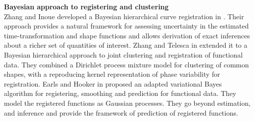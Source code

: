 \noindent
{\bf{Bayesian approach to registering and clustering}} \\
Zhang and Inoue developed a Bayesian hierarchical curve registration in \cite{Telesca_Inoue_2008_JASA}. Their approach provides a natural framework for assessing uncertainty in the estimated time-transformation and shape functions and allows derivation of exact inferences about a richer set of quantities of interest. Zhang and Telesca in \cite{Zhang_Telesca_2014_arXiv} extended it to a Bayesian hierarchical approach to joint clustering and registration of functional data. They combined a Dirichlet process mixture model for clustering of common shapes, with a reproducing kernel representation of phase variability for registration. Earls and Hooker in \cite{Earls_Hooker_2015_arXiv} proposed an adapted variational Bayes algorithm for registering, smoothing and prediction for functional data. They model the registered 
functions as Gaussian processes. They go beyond estimation, and inference and provide the framework of prediction of registered functions. 


